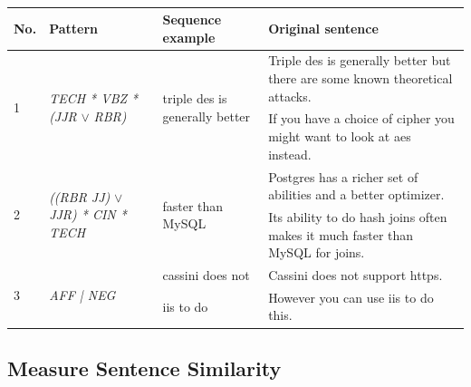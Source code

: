 \begin{table}
	\centering
	\caption{}
	\begin{tabular}{l|l|l|l}
		\hline 
		\textbf{No.} & \textbf{Pattern} & \textbf{Sequence example} & \textbf{Original sentence} \\ \hline
		\multirow{2}{*}{1} & \multirow{2}{*}{ \textit{TECH * VBZ * (JJR} $\lor$\textit{ RBR)}} & \multirow{2}{*}{triple des is generally better} & Triple des is generally better but there are some known theoretical attacks. \\ & & & If you have a choice of cipher you might want to look at aes instead. \\
		\hline
		\multirow{2}{*}{2} & \multirow{2}{*}{\textit{((RBR JJ) } $\lor$\textit{ JJR) * CIN * TECH}} & \multirow{2}{*}{faster than MySQL}  & Postgres has a richer set of abilities and a better optimizer.\\& & &  Its ability to do hash joins often makes it much faster than MySQL for joins. \\
		\hline
		\multirow{2}{*}{3} & \multirow{2}{*}{\textit{AFF | NEG}} & cassini does not & Cassini does not support https. \\ & &iis to do  & However you can use iis to do this.\\
		\hline
	\end{tabular}
	\label{tab:patternMultiple}
\end{table}


\subsection{Measure Sentence Similarity}
\label{sec:measuresimilarity}

